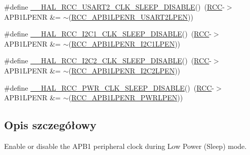 \begin{DoxyCompactItemize}
\item 
\#define \hyperlink{group___r_c_c___a_p_b1___low_power___enable___disable_ga3ad038000c76cee2e7ca00d56ba64c17}{\+\_\+\+\_\+\+H\+A\+L\+\_\+\+R\+C\+C\+\_\+\+U\+S\+A\+R\+T2\+\_\+\+C\+L\+K\+\_\+\+S\+L\+E\+E\+P\+\_\+\+D\+I\+S\+A\+B\+LE}()~(\hyperlink{group___peripheral__declaration_ga74944438a086975793d26ae48d5882d4}{R\+CC}-\/$>$A\+P\+B1\+L\+P\+E\+NR \&= $\sim$(\hyperlink{group___peripheral___registers___bits___definition_ga6055c39af369463e14d6ff2017043671}{R\+C\+C\+\_\+\+A\+P\+B1\+L\+P\+E\+N\+R\+\_\+\+U\+S\+A\+R\+T2\+L\+P\+EN}))
\item 
\#define \hyperlink{group___r_c_c___a_p_b1___low_power___enable___disable_gac7dc1c5239cd70bee94eefa3d91cdd7a}{\+\_\+\+\_\+\+H\+A\+L\+\_\+\+R\+C\+C\+\_\+\+I2\+C1\+\_\+\+C\+L\+K\+\_\+\+S\+L\+E\+E\+P\+\_\+\+D\+I\+S\+A\+B\+LE}()~(\hyperlink{group___peripheral__declaration_ga74944438a086975793d26ae48d5882d4}{R\+CC}-\/$>$A\+P\+B1\+L\+P\+E\+NR \&= $\sim$(\hyperlink{group___peripheral___registers___bits___definition_ga33286469d0a9b9fedbc2b60aa6cd7da7}{R\+C\+C\+\_\+\+A\+P\+B1\+L\+P\+E\+N\+R\+\_\+\+I2\+C1\+L\+P\+EN}))
\item 
\#define \hyperlink{group___r_c_c___a_p_b1___low_power___enable___disable_ga46fe2d4331320cfe49b751b5488fc0cd}{\+\_\+\+\_\+\+H\+A\+L\+\_\+\+R\+C\+C\+\_\+\+I2\+C2\+\_\+\+C\+L\+K\+\_\+\+S\+L\+E\+E\+P\+\_\+\+D\+I\+S\+A\+B\+LE}()~(\hyperlink{group___peripheral__declaration_ga74944438a086975793d26ae48d5882d4}{R\+CC}-\/$>$A\+P\+B1\+L\+P\+E\+NR \&= $\sim$(\hyperlink{group___peripheral___registers___bits___definition_gaf6a53d37df11a56412ae06f73626f637}{R\+C\+C\+\_\+\+A\+P\+B1\+L\+P\+E\+N\+R\+\_\+\+I2\+C2\+L\+P\+EN}))
\item 
\#define \hyperlink{group___r_c_c___a_p_b1___low_power___enable___disable_ga7b9889044ebfe2c9328d0f6733fda87d}{\+\_\+\+\_\+\+H\+A\+L\+\_\+\+R\+C\+C\+\_\+\+P\+W\+R\+\_\+\+C\+L\+K\+\_\+\+S\+L\+E\+E\+P\+\_\+\+D\+I\+S\+A\+B\+LE}()~(\hyperlink{group___peripheral__declaration_ga74944438a086975793d26ae48d5882d4}{R\+CC}-\/$>$A\+P\+B1\+L\+P\+E\+NR \&= $\sim$(\hyperlink{group___peripheral___registers___bits___definition_ga274fa282ad1ff40b747644bf9360feb4}{R\+C\+C\+\_\+\+A\+P\+B1\+L\+P\+E\+N\+R\+\_\+\+P\+W\+R\+L\+P\+EN}))
\end{DoxyCompactItemize}


\subsection{Opis szczegółowy}
Enable or disable the A\+P\+B1 peripheral clock during Low Power (Sleep) mode. 

